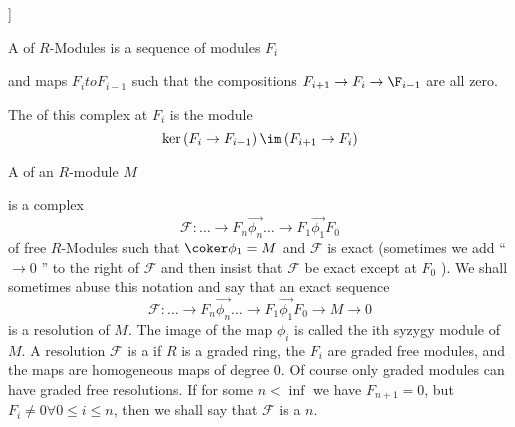 \documentclass{article}
\begin{document}
% 



\begin{defn}[Complex of $R$-modules \nocite[Eis1]{1.10} ]

A  of $R$-Modules is a sequence of modules \( F_{i} \)


and maps \( F_{i} to F_{i-1} \) such that the compositions \( F_{i+1} \to F_{i} \to \F_{i-1} \) are all zero.


The  of this complex at \( F_{i} \) is the module 
\[
	\ker \left( F_{i} \to F_{i-1} \right)   \/ \im \left( F_{i+1} \to F_{i} \right)
\]


A  of an \( R\)-module \( M \)


is a complex
\[
	\mathcal{F}: \hdots \to F_{n} \overset{\to}{\phi_{n}} 
	\hdots \to F_{1} \overset{\to}{\phi_{1}} F_{0}
\]
of free \(R\)-Modules such that \( \coker \phi_{1} = M \) 
and \( \mathcal{F} \)  is exact (sometimes we add `` \( \to 0 \) '' to the right of \(\mathcal{F}\) and then insist that \(\mathcal{F}\) be exact except at \( F_{0} \) ).
We shall sometimes abuse this notation and say that an exact sequence 
\[
	\mathcal{F}: \hdots \to F_{n} \overset{\to}{\phi_{n}} 
	\hdots \to F_{1} \overset{\to}{\phi_{1}} F_{0}
	\to M \to 0
\]
is a resolution of \( M \).  
The image of the map \( \phi_i \) is called the ith syzygy module of \(M \).
A resolution \( \mathcal{F }\) is a  if \( R \) is a graded ring, the \(  F_{i}\) are graded free modules, and the maps are homogeneous maps of degree 0.
Of course only graded modules can have graded free resolutions.
If for some \( n < \inf \) we have \( F_{n+1}=0 \), 
but \( F_{i} \neq 0 \forall 0 \le i \le n \), then we shall say that 
\( \mathcal{F}\) is a  \( n\).
\end{defn}
\end{document}
